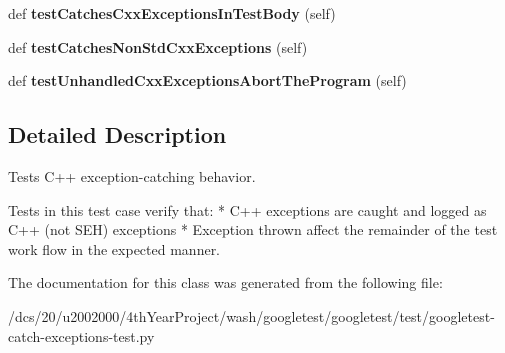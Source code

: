 \begin{DoxyCompactItemize}
def {\bfseries test\+Catches\+Cxx\+Exceptions\+In\+Test\+Body} (self)
\item 
\mbox{\label{classgoogletest-catch-exceptions-test_1_1CatchCxxExceptionsTest_a01731aaf8269fc952559f5684b395119}} 
def {\bfseries test\+Catches\+Non\+Std\+Cxx\+Exceptions} (self)
\item 
\mbox{\label{classgoogletest-catch-exceptions-test_1_1CatchCxxExceptionsTest_ab2304b62b833f0729e8909ad8615212c}} 
def {\bfseries test\+Unhandled\+Cxx\+Exceptions\+Abort\+The\+Program} (self)
\end{DoxyCompactItemize}


\subsection{Detailed Description}
\begin{DoxyVerb}Tests C++ exception-catching behavior.

Tests in this test case verify that:
* C++ exceptions are caught and logged as C++ (not SEH) exceptions
* Exception thrown affect the remainder of the test work flow in the
  expected manner.
\end{DoxyVerb}
 

The documentation for this class was generated from the following file\+:\begin{DoxyCompactItemize}
\item 
/dcs/20/u2002000/4th\+Year\+Project/wash/googletest/googletest/test/googletest-\/catch-\/exceptions-\/test.\+py\end{DoxyCompactItemize}
